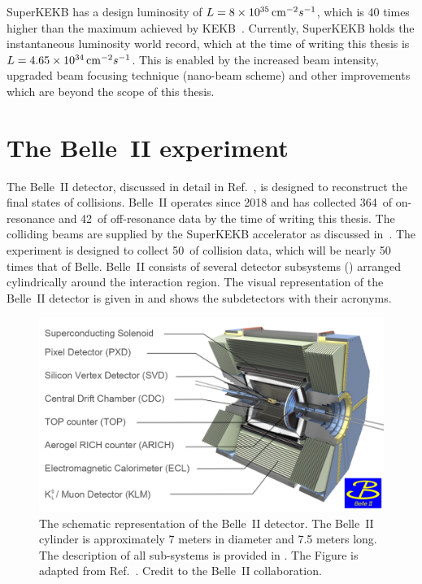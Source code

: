 SuperKEKB has a design luminosity of $L=8\times10^{35}{\rm \,cm}^{-2}s^{-1}$, which is 40 times higher than the maximum achieved by KEKB~\cite{Funakoshi:2022dai}.
Currently, SuperKEKB holds the instantaneous luminosity world record, which at the time of writing this thesis is $L = 4.65\times10^{34}{\rm \,cm}^{-2}s^{-1}$.
This is enabled by the increased beam intensity, upgraded beam focusing technique (nano-beam scheme) and other improvements which are beyond the scope of this thesis.


\section{The Belle~II experiment}\label{sec:belle2}
The Belle~II detector, discussed in detail in Ref.~\cite{Belle-II:2010dht}, is designed to reconstruct the final states of \epem collisions.
Belle~II operates since 2018 and has collected 364~\invfb of on-resonance and 42~\invfb of off-resonance data by the time of writing this thesis.
The colliding beams are supplied by the SuperKEKB accelerator as discussed in~.
The experiment is designed to collect 50~\invab of collision data, which will be nearly 50 times that of Belle.
Belle~II consists of several detector subsystems () arranged cylindrically around the interaction region. 
The visual representation of the Belle~II detector is given in  and shows the subdetectors with their acronyms.
\begin{figure}[hbtp!]
    \includegraphics[width=1\textwidth]{figures/experimental_setup/belle2.png}
    \caption{\label{fig:belle2_detector} The schematic representation of the Belle~II detector.
    The Belle~II cylinder is approximately 7 meters in diameter and 7.5 meters long.
    The description of all sub-systems is provided in .
    The Figure is adapted from Ref.~\cite{belle_2_picture}.
    Credit to the Belle~II collaboration.
    }
\end{figure}

